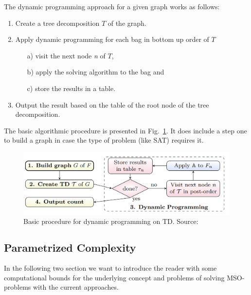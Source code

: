 \documentclass[a4paper, 12pt, bibliography=totoc]{scrartcl}
\begin{document}
The dynamic programming approach for a given graph works as follows:
\begin{enumerate}
	\filbreak
	\item Create a tree decomposition ${T}$ of the graph.
	\item Apply dynamic programming for each bag in bottom up order of ${T}$
	\begin{itemize}
		\item[a)] visit the next node \textit{n} of ${T}$,
		\item[b)] apply the solving algorithm to the bag and
		\item[c)] store the results in a table.
	\end{itemize}
	\item Output the result based on the table of the root node of the tree decomposition.
\end{enumerate}

The basic algorithmic procedure is presented in Fig.~\ref{fig:dpalgo}. It does include a step one to build a graph in case the type of problem (like SAT) requires it.
\begin{figure}[h]
	\centering
	\includegraphics{images/DPAlgo31.png}
	\caption[Basic procedure for dynamic programming on TD]{ Basic procedure for dynamic programming on TD. Source: \cite[Figure~3.1]{DiplomarbeitZisser} }
	\label{fig:dpalgo}
\end{figure}

\pagebreak
\subsection{Parametrized Complexity}
In the following two section we want to introduce the reader with some computational bounds for the underlying concept and problems of solving MSO-problems with the current approaches.

\end{document}
